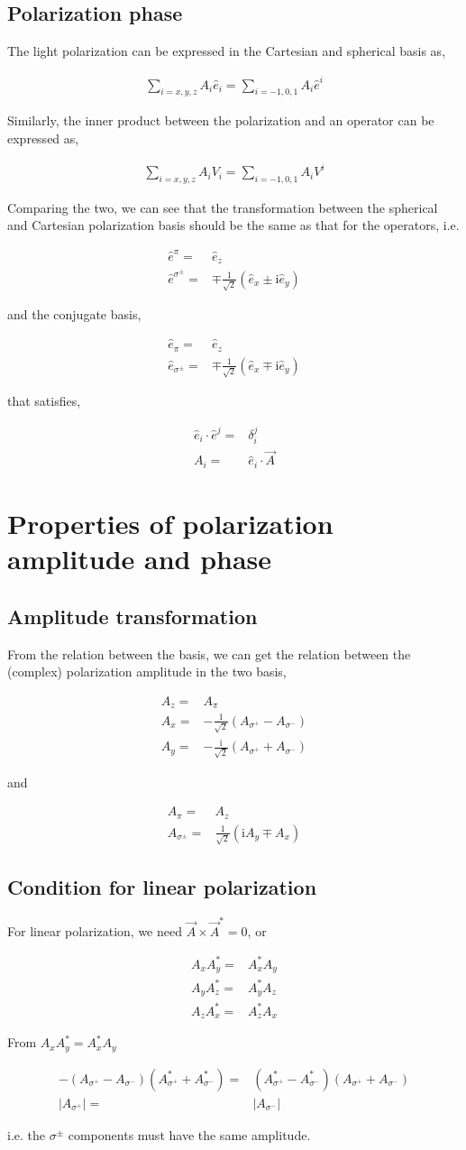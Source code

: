 \documentclass[10pt,fleqn]{article}
\newcommand{\ui}{\mathrm{i}}
\newcommand{\eqar}[1]
{
  \begin{align}
    #1
  \end{align}
}
\newcommand{\paren}[1]{{\left({#1}\right)}}
\newcommand{\abs}[1]{{\left|{#1}\right|}}
\begin{document}
\subsection{Polarization phase}
The light polarization can be expressed in the Cartesian and spherical basis as,
\eqar{
  \sum_{i=x,y,z}\!A_i\hat e_i=\sum_{i=-1,0,1}\!A_i\hat e^i
}
Similarly, the inner product between the polarization and an operator
can be expressed as,
\eqar{
  \sum_{i=x,y,z}\!A_i V_i=\sum_{i=-1,0,1}\!A_i V^i
}
Comparing the two, we can see that the transformation between the spherical
and Cartesian polarization basis should be the same as that for the operators, i.e.
\eqar{
  \hat e^\pi=&\hat e_z\\
  \hat e^{\sigma^\pm}=&\mp\frac{1}{\sqrt{2}}\paren{\hat e_x\pm\ui\hat e_y}
}
and the conjugate basis,
\eqar{
  \hat e_\pi=&\hat e_z\\
  \hat e_{\sigma^\pm}=&\mp\frac{1}{\sqrt{2}}\paren{\hat e_x\mp\ui\hat e_y}
}
that satisfies,
\eqar{
  \hat e_i\cdot\hat e^j=&\delta_i^j\\
  A_i=&\hat e_i\cdot\vec A
}

\section{Properties of polarization amplitude and phase}
\subsection{Amplitude transformation}
From the relation between the basis, we can get the relation between
the (complex) polarization amplitude in the two basis,
\eqar{
  A_z=&A_\pi\\
  A_x=&-\frac{1}{\sqrt{2}}\paren{A_{\sigma^+}-A_{\sigma^-}}\\
  A_y=&-\frac{\ui}{\sqrt{2}}\paren{A_{\sigma^+}+A_{\sigma^-}}
}
and
\eqar{
  A_\pi=&A_z\\
  A_{\sigma^\pm}=&\frac{1}{\sqrt{2}}\paren{\ui A_y\mp A_x}
}

\subsection{Condition for linear polarization}
For linear polarization, we need $\vec A\times\vec A^*=0$, or
\eqar{
  A_xA_y^*=&A_x^*A_y\\
  A_yA_z^*=&A_y^*A_z\\
  A_zA_x^*=&A_z^*A_x
}
From $A_xA_y^*=A_x^*A_y$
\eqar{
  -\paren{A_{\sigma^+}-A_{\sigma^-}}\paren{A_{\sigma^+}^*+A_{\sigma^-}^*}=&\paren{A_{\sigma^+}^*-A_{\sigma^-}^*}\paren{A_{\sigma^+}+A_{\sigma^-}}\\
  \abs{A_{\sigma^+}}=&\abs{A_{\sigma^-}}
}
i.e. the $\sigma^\pm$ components must have the same amplitude.\\
\end{document}
